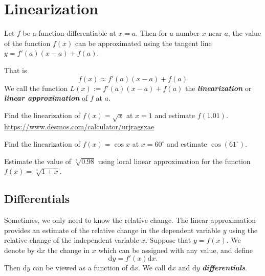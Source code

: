 
\hypertarget{linearization}{%
\section{Linearization}\label{linearization}}

Let \(f\) be a function differentiable at \(x=a\). Then for a number
\(x\) near \(a\), the value of the function \(f(x)\) can be approximated
using the tangent line \(y=f'(a)(x-a)+f(a)\).

That is \[f(x)\approx f'(a)(x-a)+f(a)\] We call the function
\(L(x):=f'(a)(x-a)+f(a)\) the \textbf{\emph{linearization}} or
\textbf{\emph{linear approximation}} of \(f\) at \(a\).

\begin{example}

Find the linearization of \(f(x)=\sqrt{x}\) at \(x=1\) and estimate
\(f(1.01)\). \url{https://www.desmos.com/calculator/urjragsxae}

\end{example}
\vspace*{6\baselineskip}

\begin{example}

Find the linearization of \(f(x)=\cos x\) at \(x=60^\circ\) and estimate
\(\cos(61^\circ)\).

\end{example}
\vspace*{6\baselineskip}

\begin{example}

Estimate the value of \(\sqrt[3]{0.98}\) using local linear
approximation for the function \(f(x)=\sqrt[3]{1+x}\).

\end{example}
\vspace*{6\baselineskip}

\hypertarget{differentials}{%
\subsection{Differentials}\label{differentials}}

Sometimes, we only need to know the relative change. The linear
approximation provides an estimate of the relative change in the
dependent variable \(y\) using the relative change of the independent
variable \(x\). Suppose that \(y=f(x)\). We denote by \(\mathrm{d}x\)
the change in \(x\) which can be assigned with any value, and define
\[\mathrm{d}y=f'(x)\mathrm{d}x.\] Then \(\mathrm{d}y\) can be viewed as
a function of \(\mathrm{d}x\). We call \(\mathrm{d}x\) and
\(\mathrm{d}y\) \textbf{\emph{differentials}}.


